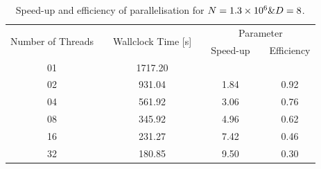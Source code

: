\documentclass[11pt, oneside]{article}
\begin{document}
                \begin{table}[h]
  \caption{Speed-up and efficiency of parallelisation for $N = \num{1.3d6} \text{\&} D = 8$.}
  \label{tab:measures}
  \centering
  \begin{tabular}{ccccccc}
    \toprule
    \multirow{2}{*}{Number of Threads} &\phantom{abc} & \multirow{2}{*}{Wallclock Time [s]} &\phantom{abc} & \multicolumn{3}{c}{Parameter} \\
    \cmidrule{5-7}
    &\phantom{abc} & & \phantom{abc} & Speed-up & \phantom{abc} & {Efficiency}\\
    \midrule
    01 && 1717.20 && {} && {} \\
    02 && 931.04 && 1.84 && 0.92 \\
    04 && 561.92 && 3.06 && 0.76 \\
    08 && 345.92 && 4.96 && 0.62 \\
    16 && 231.27 && 7.42 && 0.46 \\
    32 && 180.85 && 9.50 && 0.30 \\
    \bottomrule
  \end{tabular}
\end{table}
\end{document}
